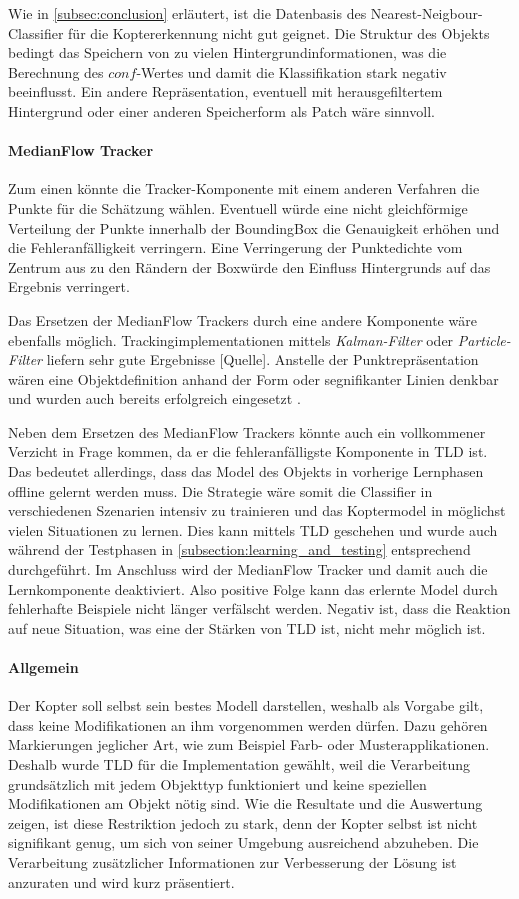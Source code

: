 	Wie in \ref{subsec:conclusion} erläutert, ist die Datenbasis des Nearest-Neigbour-Classifier für die Koptererkennung nicht gut geignet. Die Struktur des Objekts bedingt das Speichern von zu vielen Hintergrundinformationen, was die Berechnung des $conf$-Wertes und damit die Klassifikation stark negativ beeinflusst. Ein andere Repräsentation, eventuell mit herausgefiltertem Hintergrund oder einer anderen Speicherform als Patch wäre sinnvoll.

	\paragraph{MedianFlow Tracker}
		Zum einen könnte die Tracker-Komponente mit einem anderen Verfahren die Punkte für die Schätzung wählen. Eventuell würde eine nicht gleichförmige Verteilung der Punkte innerhalb der BoundingBox die Genauigkeit erhöhen und die Fehleranfälligkeit verringern. Eine Verringerung der Punktedichte vom Zentrum aus zu den Rändern der Boxwürde den Einfluss Hintergrunds auf das Ergebnis verringert.

		Das Ersetzen der MedianFlow Trackers durch eine andere Komponente wäre ebenfalls möglich. Trackingimplementationen mittels {\em Kalman-Filter} \cite{KAF} oder {\em Particle-Filter} \cite{PAF} liefern sehr gute Ergebnisse [Quelle]. Anstelle der Punktrepräsentation wären eine Objektdefinition anhand der Form oder segnifikanter Linien denkbar und wurden auch bereits erfolgreich eingesetzt \cite{AVT}.

		Neben dem Ersetzen des MedianFlow Trackers könnte auch ein vollkommener Verzicht in Frage kommen, da er die fehleranfälligste Komponente in TLD ist. Das bedeutet allerdings, dass das Model des Objekts in vorherige Lernphasen offline gelernt werden muss. Die Strategie wäre somit die Classifier in verschiedenen Szenarien intensiv zu trainieren und das Koptermodel in möglichst vielen Situationen zu lernen. Dies kann mittels TLD geschehen und wurde auch während der Testphasen in \ref{subsection:learning_and_testing} entsprechend durchgeführt. Im Anschluss wird der MedianFlow Tracker und damit auch die Lernkomponente deaktiviert. Also positive Folge kann das erlernte Model durch fehlerhafte Beispiele nicht länger verfälscht werden. Negativ ist, dass die Reaktion auf neue Situation, was eine der Stärken von TLD ist, nicht mehr möglich ist.

	\paragraph{Allgemein}
		Der Kopter soll selbst sein bestes Modell darstellen, weshalb als Vorgabe gilt, dass keine Modifikationen an ihm vorgenommen werden dürfen. Dazu gehören Markierungen jeglicher Art, wie zum Beispiel Farb- oder Musterapplikationen. Deshalb wurde TLD für die Implementation gewählt, weil die Verarbeitung grundsätzlich mit jedem Objekttyp funktioniert und keine speziellen Modifikationen am Objekt nötig sind. Wie die Resultate und die Auswertung zeigen, ist diese Restriktion jedoch zu stark, denn der Kopter selbst ist nicht signifikant genug, um sich von seiner Umgebung ausreichend abzuheben. Die Verarbeitung zusätzlicher Informationen zur Verbesserung der Lösung ist anzuraten und wird kurz präsentiert.

